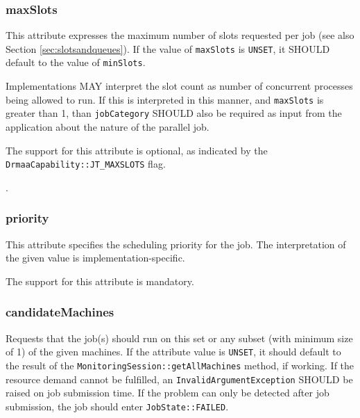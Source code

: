 \documentclass{article}
\newcommand{\h}[1]{\lstinline|#1|}
\newcommand{\rat}[1]{}
\begin{document}
\rat{The hint regarding number of concurrent processes intentionally does not speak about processes per host - this would create semantics for our opaque slot concept.}

\subsubsection{maxSlots}

This attribute expresses the maximum number of slots requested per job (see also Section \ref{sec:slotsandqueues}). If the value of \h{maxSlots} is \h{UNSET}, it SHOULD default to the value of \h{minSlots}.

Implementations MAY interpret the slot count as number of concurrent processes being allowed to run. If this is interpreted in this manner, and \h{maxSlots} is greater than 1, than \h{jobCategory} SHOULD also be required as input from the application about the nature of the parallel job.

The support for this attribute is optional, as indicated by the \h{DrmaaCapability::JT_MAXSLOTS} flag.

\rat{Torque does not support maxSlots on job submission, conf call on May 11th decided to keep it as optional feature. Expected use cases are billing limitations and parallel job scalability considerations}.

\subsubsection{priority}

This attribute specifies the scheduling priority for the job. The interpretation of the given value is implementation-specific.

The support for this attribute is mandatory.

\subsubsection{candidateMachines}

Requests that the job(s) should run on this set or any subset (with minimum size of 1) of the given machines. If the attribute value is \h{UNSET}, it should default to the result of the \h{MonitoringSession::getAllMachines} method, if working. If the resource demand cannot be fulfilled, an \h{InvalidArgumentException} SHOULD be raised on job submission time. If the problem can only be detected after job submission, the job should enter \h{JobState::FAILED}. 
\end{document}
